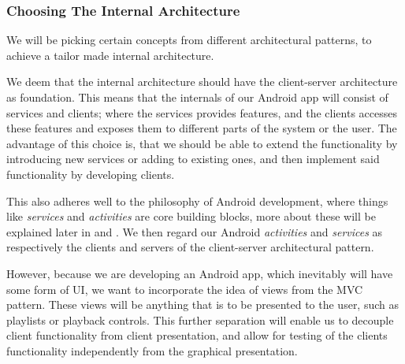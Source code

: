 \subsubsection{Choosing The Internal Architecture}
We will be picking certain concepts from different architectural patterns, to achieve a tailor made internal architecture.

We deem that the internal architecture should have the client-server architecture as foundation.
This means that the internals of our Android app will consist of services and clients;
where the services provides features, and the clients accesses these features and exposes them to different parts of the system or the user.
The advantage of this choice is, that we should be able to extend the functionality by introducing new services or adding to existing ones, and then implement said functionality by developing clients.

This also adheres well to the philosophy of Android development, where things like \textit{services} and \textit{activities} are core building blocks, more about these will be explained later in  and .
We then regard our Android \textit{activities} and \textit{services} as respectively the clients and servers of the client-server architectural pattern.

However, because we are developing an Android app, which inevitably will have some form of \ac{UI}, we want to incorporate the idea of views from the \ac{MVC} pattern.
These views will be anything that is to be presented to the user, such as playlists or playback controls.
This further separation will enable us to decouple client functionality from client presentation, and allow for testing of the clients functionality independently from the graphical presentation.


